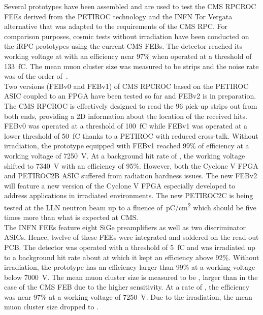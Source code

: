 	Several prototypes have been assembled and are used to test the CMS RPCROC FEEs derived from the PETIROC technology and the INFN Tor Vergata alternative that was adapted to the requirements of the CMS RPC. For comparison purposes, cosmic tests without irradiation have been conducted on the iRPC prototypes using the current CMS FEBs. The detector reached its working voltage at  with an efficiency near 97\% when operated at a threshold of \SI{133}{fC}. The mean muon cluster size was measured to be  strips and the noise rate was of the order of \,\sirate.\\
	Two versions (FEBv0 and FEBv1) of CMS RPCROC based on the PETIROC ASIC coupled to an FPGA have been tested so far and FEBv2 is in preparation. The CMS RPCROC is effectively designed to read the 96 pick-up strips out from both ends, providing a 2D information about the location of the received hits. FEBv0 was operated at a threshold of \SI{100}{fC} while FEBv1 was operated at a lower threshold of \SI{50}{fC} thanks to a PETIROC with reduced cross-talk. Without irradiation, the prototype equipped with FEBv1 reached 99\% of efficiency at a working voltage of \SI{7250}{V}. At a background hit rate of , the working voltage shifted to \SI{7340}{V} with an efficiency of 95\%. However, both the Cyclone V FPGA and PETIROC2B ASIC suffered from radiation hardness issues. The new FEBv2 will feature a new version of the Cyclone V FPGA especially developed to address applications in irradiated environments. The new PETIROC2C is being tested at the \acf{LLN} neutron beam up to a fluence of \,\si{pC/cm^2} which should be five times more than what is expected at CMS.\\
	The INFN FEEs feature eight SiGe preamplifiers as well as two discriminator ASICs. Hence, twelve of these FEEs were integrated and soldered on the read-out PCB. The detector was operated with a threshold of \SI{5}{fC} and was irradiated up to a background hit rate about  at which it kept an efficiency above 92\%. Without irradiation, the prototype has an efficiency larger than 99\% at a working voltage below \SI{7000}{V}. The mean muon cluster size is measured to be , larger than in the case of the CMS FEB due to the higher sensitivity. At a rate of , the efficiency was near 97\% at a working voltage of \SI{7250}{V}. Due to the irradiation, the mean muon cluster size dropped to .\hspace{5mm}
	
